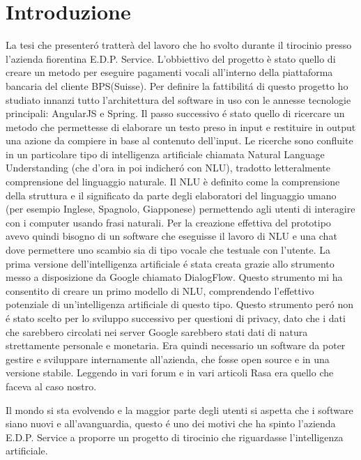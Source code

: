 \chapter{Introduzione}

La tesi che presenter\'{o} tratter\`{a} del lavoro che ho svolto durante il tirocinio presso l'azienda fiorentina E.D.P. Service. 
L'obbiettivo del progetto \`{e} stato quello di creare un metodo per eseguire pagamenti vocali all'interno della piattaforma bancaria del cliente BPS(Suisse).
Per definire la fattibilit\'{a} di questo progetto ho studiato innanzi tutto l'architettura del software in uso con le annesse tecnologie principali: AngularJS e Spring.
Il passo successivo \'{e} stato quello di ricercare un metodo che permettesse di elaborare un testo preso in input e restituire in output una azione da compiere in base al contenuto dell'input. Le ricerche sono confluite in un particolare tipo di intelligenza artificiale chiamata Natural Language Understanding (che d'ora in poi indicher\'{o} con NLU), tradotto letteralmente comprensione del linguaggio naturale. 
Il NLU \`{e} definito come la comprensione della struttura e il significato da parte degli elaboratori del linguaggio umano (per esempio Inglese, Spagnolo, Giapponese) permettendo agli utenti di interagire con i computer usando frasi naturali.
Per la creazione effettiva del prototipo avevo quindi bisogno di un software che eseguisse il lavoro di NLU e una chat dove permettere uno scambio sia di tipo vocale che testuale con l'utente.
La prima versione dell'intelligenza artificiale \'e stata creata grazie allo strumento messo a disposizione da Google chiamato DialogFlow. Questo strumento mi ha consentito di creare un primo modello di NLU, comprendendo l'effettivo potenziale di un'intelligenza artificiale di questo tipo. 
Questo strumento per\'o non \'e stato scelto per lo sviluppo successivo per questioni di privacy, dato che i dati che sarebbero circolati nei server Google sarebbero stati dati di natura strettamente personale e monetaria.
Era quindi necessario un software da poter gestire e sviluppare internamente all'azienda, che fosse open source e in una versione stabile. Leggendo in vari forum e in vari articoli Rasa era quello che faceva al caso nostro.



Il mondo si sta evolvendo e la maggior parte degli utenti si aspetta che i software siano nuovi e all'avanguardia, questo \'e uno dei motivi che ha spinto l'azienda E.D.P. Service a proporre un progetto di tirocinio che riguardasse l'intelligenza artificiale. 

